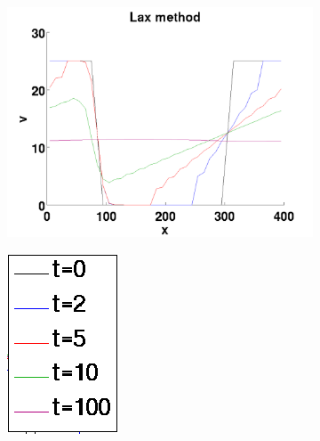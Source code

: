 \begin{figure}[h!]
\begin{subfigure}{.25\textwidth}
	\caption{}
	\label{fig:exc2_Lax_F}
\end{subfigure}
\begin{subfigure}{.25\textwidth}
	\centering
	\includegraphics[width=\textwidth]{img/exc2_Lax_v}
	\caption{}
	\label{fig:exc2_Lax_v}
\end{subfigure}
\begin{subfigure}{.09\textwidth}
	\centering
	\includegraphics[width=\textwidth]{img/exc2_legend}

\end{subfigure}
\end{figure}
